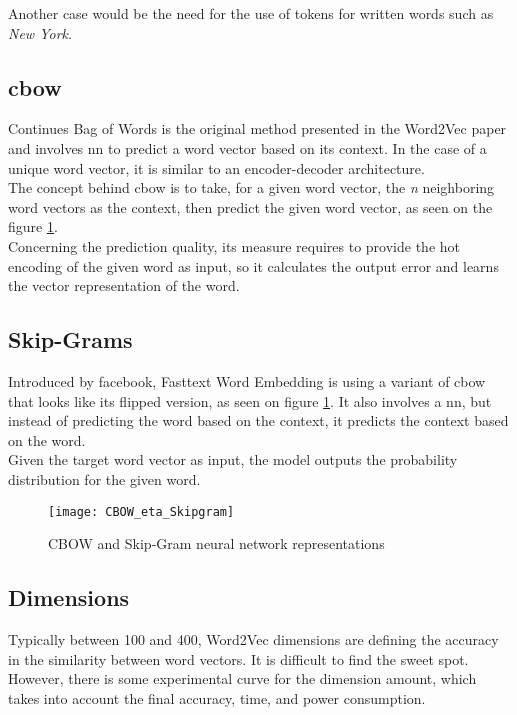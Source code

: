 Another case would be the need for the use of tokens for written words such as \textit{New York}.


\subsection{\gls{cbow}}
\label{analyse:cbow}
Continues Bag of Words is the original method presented in the Word2Vec paper \cite{article:word2vec}  and involves \gls{nn} to predict a word vector based on its context. In the case of a unique word vector, it is similar to an encoder-decoder architecture.\\

The concept behind \gls{cbow} is to take, for a given word vector, the \textit{n} neighboring word vectors as the context, then predict the given word vector, as seen on the figure \ref{fig:wikipedia_cbow_skipgram_img}.\\

Concerning the prediction quality, its measure requires to provide the hot encoding of the given word as input, so it calculates the output error and learns the vector representation of the word.

\subsection{Skip-Grams}
\label{analyse:skip-grams}
Introduced by facebook, Fasttext\cite{article:fasttext} Word Embedding is using a variant of \gls{cbow} that looks like its flipped version, as seen on figure \ref{fig:wikipedia_cbow_skipgram_img}. It also involves a \gls{nn}, but instead of predicting the word based on the context, it predicts the context based on the word.\\

Given the target word vector as input, the model outputs the probability distribution for the given word.

\begin{figure}[ht!]
    \centering
    \texttt{[image: CBOW\_eta\_Skipgram]}
    \caption{
       CBOW and Skip-Gram neural network representations\cite{wikipedia:cbow_skipgram_img}
    }
    \label{fig:wikipedia_cbow_skipgram_img}
\end{figure}

\subsection{Dimensions}
\label{analyse:dimensions}
Typically between 100 and 400, Word2Vec dimensions are defining the accuracy in the similarity between word vectors. It is difficult to find the sweet spot. However, there is some experimental curve for the dimension amount, which takes into account the final accuracy, time, and power consumption. 

